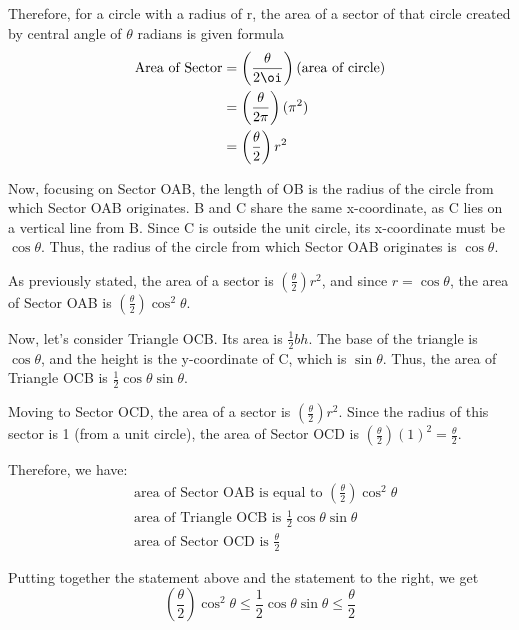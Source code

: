 \documentclass{article}
\begin{document}
\hspace{1em}


Therefore, for a circle with a radius of r, the area of a sector of that circle created by central angle of $\theta$ radians is given formula \\

\begin{align*}
    \text{Area of Sector} &= \left(\frac{\theta}{2 \oi}\right )(\text{area of circle})\\
    &=\left(\frac{\theta}{2 \pi}\right)(\pi ^2)\\
    &=\left(\frac{\theta}{2}\right)r^2
\end{align*}


Now, focusing on Sector OAB, the length of OB is the radius of the circle from which Sector OAB originates. B and C share the same x-coordinate, as C lies on a vertical line from B. Since C is outside the unit circle, its x-coordinate must be $\cos \theta$. Thus, the radius of the circle from which Sector OAB originates is $\cos \theta$.

As previously stated, the area of a sector is $\left(\frac{\theta}{2}\right)r^2$, and since $r=\cos \theta$, the area of Sector OAB is $\left(\frac{\theta}{2}\right)\cos^2\theta$.

Now, let’s consider Triangle OCB. Its area is $\frac{1}{2}bh$. The base of the triangle is $\cos \theta$, and the height is the y-coordinate of C, which is $\sin \theta$. Thus, the area of Triangle OCB is $\frac{1}{2}\cos \theta \sin \theta$.

Moving to Sector OCD, the area of a sector is $\left(\frac{\theta}{2}\right)r^2$. Since the radius of this sector is 1 (from a unit circle), the area of Sector OCD is $\left(\frac{\theta}{2}\right)(1)^2 = \frac{\theta}{2}$.

Therefore, we have:
\begin{align*}
    &\text{area of Sector OAB is equal to } \left(\frac{\theta}{2} \right)\cos^2\theta\\
    &\text{area of Triangle OCB is } \frac{1}{2}\cos \theta \sin \theta \\
    &\text{area of Sector OCD is } \frac{\theta}{2}
\end{align*}


Putting together the statement above and the statement to the right, we get
\begin{equation*}
    \left(\frac{\theta}{2} \right)\cos^2\theta \leq \frac{1}{2}\cos \theta \sin \theta \leq \frac{\theta}{2}
\end{equation*}
\end{document}
